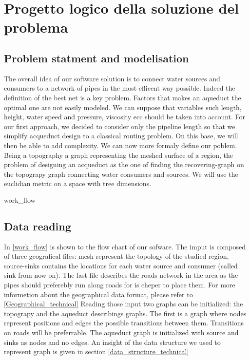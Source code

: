 \chapter{Progetto logico della soluzione del problema}
\label{capitolo4}
\thispagestyle{empty}

\section {Problem statment and modelisation}
The overall idea of our software solution is to connect water sources and consumers to a network of pipes in the most efficent way possible. Indeed the definition of the best net is a key problem. Factors that makes an aqueduct the optimal one are not easily modeled. We can suppose that variables such length, height, water speed and pressure, viscosity ecc should be taken into account.
\hfill For our first approach, we decided to consider only the pipeline length so that we simplify acqueduct design to a classical routing problem. On this base, we will then be able to add complexity.
\hfill We can now more formaly define our poblem. Being a topography a graph representing the meshed surface of a region, the problem of designing an acqueduct as the one of finding the recovering-graph on the topograpy graph connecting water consumers and sources. We will use the euclidian metric on a space with tree dimensions.

 {work_flow}

\section {Data reading}
In \ref {work_flow} is shown to the flow chart of our sofware. 
The imput is composed of three geografical files: mesh represent the topology of the studied region, source-sinks contains the locations for each water source and consumer (called sink from now on). The last file describes the roads network in the area as the pipes should preferebly run along roads for is cheper to place them. For more informetion about the geographical data format, please refer to \ref{Geographical_technical}
Reading those input two graphs can be initialized: the topograpy and the aqueduct describings graphs. The first is a graph where nodes represent positions and edges the possible transitions between them. Transitions on roads will be preferrable. The aqueduct graph is initialized with source and sinks as nodes and no edges. An insight of the data structure we used to represent graph is given in section \ref {data_structure_technical}

